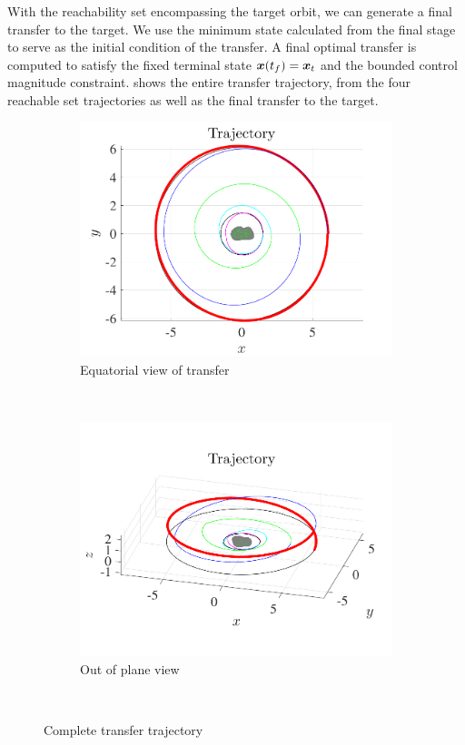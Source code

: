 \documentclass[]{aiaa-tc}%
\begin{document}
With the reachability set encompassing the target orbit, we can generate a final transfer to the target.
We use the minimum state calculated from the final stage to serve as the initial condition of the transfer.
A final optimal transfer is computed to satisfy the fixed terminal state \( \bm{x}(t_f) = \bm{x}_t \) and the bounded control magnitude constraint.
 shows the entire transfer trajectory, from the four reachable set trajectories as well as the final transfer to the target.
\begin{figure}[htbp] 
    \centering 
    \begin{subfigure}[htbp]{0.45\textwidth} 
        \includegraphics[width=\textwidth]{figures/trajectory.pdf} 
        \caption{Equatorial view of transfer} \label{fig:trajectory_up} 
    \end{subfigure}~
    \begin{subfigure}[htbp]{0.45\textwidth} 
        \includegraphics[width=\textwidth]{figures/trajectory_3d.pdf} 
        \caption{Out of plane view} \label{fig:trajectory_3d} 
    \end{subfigure}~ 
    \caption{Complete transfer trajectory}
    \label{fig:trajectory} 
\end{figure}
\end{document}
